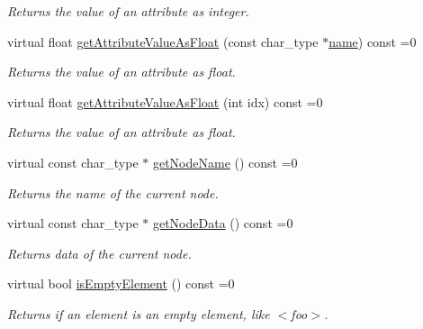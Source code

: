 \begin{CompactItemize}
\begin{CompactList}\small\item\em Returns the value of an attribute as integer. \item\end{CompactList}\item 
virtual float \hyperlink{classirr_1_1io_1_1_i_irr_x_m_l_reader_2b1032f213e9910827842f6057269235}{getAttributeValueAsFloat} (const char\_\-type $\ast$\hyperlink{glext__bak_8h_bb62efe59ccdd153ce42e1a418352209}{name}) const =0
\begin{CompactList}\small\item\em Returns the value of an attribute as float. \item\end{CompactList}\item 
virtual float \hyperlink{classirr_1_1io_1_1_i_irr_x_m_l_reader_3a01b3cec9db01d00928074846d39add}{getAttributeValueAsFloat} (int idx) const =0
\begin{CompactList}\small\item\em Returns the value of an attribute as float. \item\end{CompactList}\item 
virtual const char\_\-type $\ast$ \hyperlink{classirr_1_1io_1_1_i_irr_x_m_l_reader_7d745b130c895d0f910f191d04e20e87}{getNodeName} () const =0
\begin{CompactList}\small\item\em Returns the name of the current node. \item\end{CompactList}\item 
virtual const char\_\-type $\ast$ \hyperlink{classirr_1_1io_1_1_i_irr_x_m_l_reader_ecbe0698e8f9acf88e27dd53da984210}{getNodeData} () const =0
\begin{CompactList}\small\item\em Returns data of the current node. \item\end{CompactList}\item 
virtual bool \hyperlink{classirr_1_1io_1_1_i_irr_x_m_l_reader_3c85b144e0376c9ff90bce1bbbc338a9}{isEmptyElement} () const =0
\begin{CompactList}\small\item\em Returns if an element is an empty element, like $<$foo$>$. \item\end{CompactList}\item 

\end{CompactItemize}
